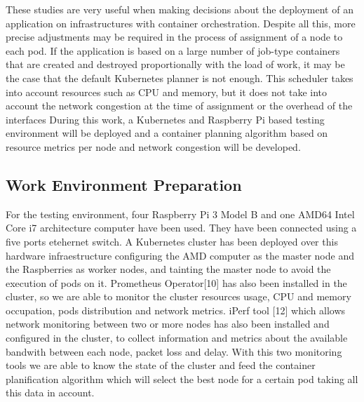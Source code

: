 \documentclass[conference]{IEEEtran}
\begin{document}
These studies are very useful when making decisions about the deployment of an application on infrastructures with container orchestration.
Despite all this, more precise adjustments may be required in the process of assignment of a node to each pod. If the application is based on a large number of
job-type containers that are created and destroyed proportionally with the load of work, it may be the case that the default Kubernetes planner is not
enough. This scheduler takes into account resources such as CPU and memory, but it does not take into account the network congestion at the time of assignment 
or the overhead of the interfaces During this work, a Kubernetes and Raspberry Pi based testing environment will be deployed and a container planning algorithm
based on resource metrics per node and network congestion will be developed.


\subsection{Work Environment Preparation}
For the testing environment, four Raspberry Pi 3 Model B and one AMD64 Intel Core i7 architecture computer have been used. They have been connected using a five 
ports etehernet switch. A Kubernetes cluster has been deployed over this hardware infraestructure configuring the AMD computer as the master node and
the Raspberries as worker nodes, and tainting the master node to avoid the execution of pods on it. Prometheus Operator[10] 
has also been installed in the cluster, so we are able to monitor the cluster resources usage, CPU and memory occupation, pods distribution and network metrics.
iPerf tool [12] which allows network monitoring between two or more nodes has also been installed and configured in the cluster, to collect information and metrics
about the available bandwith between each node, packet loss and delay. With this two monitoring tools we are able to know the state of the cluster and feed the
container planification algorithm which will select the best node for a certain pod taking all this data in account.
\end{document}
